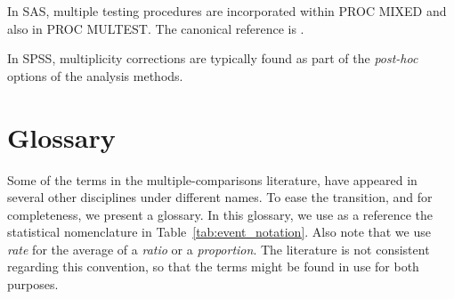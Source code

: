 \documentclass[review,12pt]{article}
\theoremstyle{definition}
\begin{document}
In SAS, multiple testing procedures are incorporated within PROC MIXED and also in PROC MULTEST.  The canonical reference is \citet{westfall_multiple_2011}. 

In SPSS, multiplicity corrections are typically found as part of the \emph{post-hoc} options of the analysis methods.



\section{\label{sec:glossary} Glossary}
Some of the terms in the multiple-comparisons literature, have appeared in several other disciplines under different names. To ease the transition, and for completeness, we present a glossary. 
In this glossary, we use as a reference the statistical nomenclature in Table~\ref{tab:event_notation}. Also note that we use \emph{rate} for the average of a \emph{ratio} or a \emph{proportion}. The literature is not consistent regarding this convention, so that the terms might be found in use for both purposes.
\end{document}
